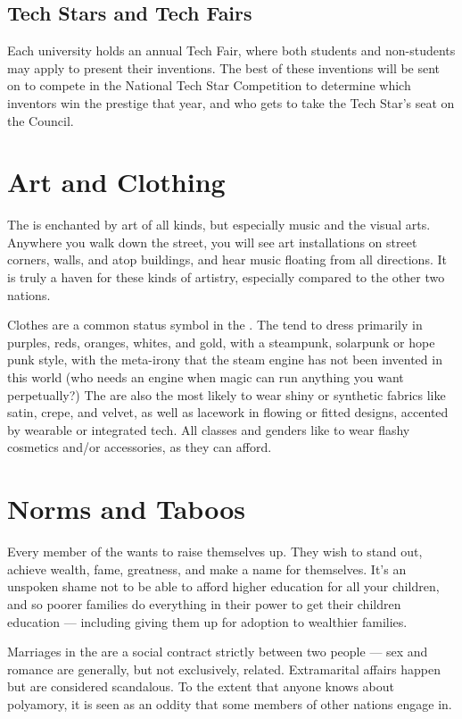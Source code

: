 \documentclass[blue]{GL2020}
\begin{document}
\subsection*{Tech Stars and Tech Fairs}
Each university holds an annual Tech Fair, where both students and non-students may apply to present their inventions. The best of these inventions will be sent on to compete in the National Tech Star Competition to determine which inventors win the prestige that year, and who gets to take the Tech Star's seat on the Council.

\section*{Art and Clothing}
The \pTech{} is enchanted by art of all kinds, but especially music and the visual arts. Anywhere you walk down the street, you will see art installations on street corners, walls, and atop buildings, and hear music floating from all directions. It is truly a haven for these kinds of artistry, especially compared to the other two nations.

Clothes are a common status symbol in the \pTech{}. The \pTechies{} tend to dress primarily in purples, reds, oranges, whites, and gold, with a steampunk, solarpunk or hope punk style, with the meta-irony that the steam engine has not been invented in this world (who needs an engine when magic can run anything you want perpetually?) The \pTechies{} are also the most likely to wear shiny or synthetic fabrics like satin, crepe, and velvet, as well as lacework in flowing or fitted designs, accented by wearable or integrated tech. All classes and genders like to wear flashy cosmetics and/or accessories, as they can afford.

\section*{Norms and Taboos}
Every member of the \pTech{} wants to raise themselves up. They wish to stand out, achieve wealth, fame, greatness, and make a name for themselves. It's an unspoken shame not to be able to afford higher education for all your children, and so poorer families do everything in their power to get their children education — including giving them up for adoption to wealthier families.  

Marriages in the \pTech{} are a social contract strictly between two people — sex and romance are generally, but not exclusively, related. Extramarital affairs happen but are considered scandalous. To the extent that anyone knows about polyamory, it is seen as an oddity that some members of other nations engage in.
\end{document}
